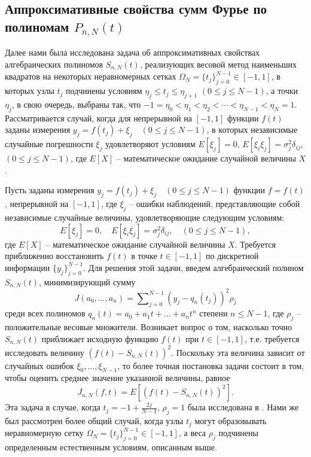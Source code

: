 
\subsection{Аппроксимативные свойства сумм Фурье по полиномам $P_{n,N}(t)$}

Далее нами была исследована задача об аппроксимативных свойствах  алгебраических полиномов $S_{n,N}(t)$, реализующих весовой метод наименьших квадратов на некоторых неравномерных сетках  $\Omega_N = \{ t_j \}_{j=0}^{N-1} \in [-1,1]$, в которых узлы $t_j$ подчинены условиям $\eta_{j}\leq t_{j} \leq \eta_{j+1}$ $(0\leq j \leq N-1)$, а точки $\eta_{j}$, в свою очередь, выбраны так, что $-1=\eta_{0}<\eta_{1}<\eta_{2}<\cdots<\eta_{N-1}<\eta_{N}=1$. Рассматривается случай, когда для  непрерывной на $[-1,1]$  функции $f(t)$ заданы измерения $y_j = f(t_j) + \xi_{j} \quad  (0 \leq j \leq N-1)$, в которых независимые случайные погрешности $\xi_{j}$ удовлетворяют условиям $E[\xi_j] = 0$, $E[\xi_i \xi_j] = \sigma_j^2 \delta_{ij}$, $(0 \leq j \leq N-1)$, где $E[X]$ -- математическое ожидание случайной величины $X$.




Пусть заданы измерения
$y_j = f(t_j) + \xi_{j} \quad  (0 \leq j \leq N-1)$
функции $f = f(t)$, непрерывной на $[-1, 1]$, где $\xi_j$ -- ошибки наблюдений, представляющие собой независимые случайные величины, удовлетворяющие следующим условиям:
\begin{equation}
\label{SMS2.link1}
 E[\xi_j] = 0, \quad E[\xi_i \xi_j] = \sigma_j^2 \delta_{ij}, \quad (0 \leq j \leq N-1),
\end{equation}
где $E[X]$ -- математическое ожидание случайной величины $X$.
Требуется приближенно восстановить $f(t)$ в точке $t \in [-1, 1]$ по дискретной информации $\{ y_j \}_{j=0}^{N-1}$.
Для решения этой задачи, введем алгебраический полином $S_{n,N}(t)$, минимизирующий сумму
\begin{equation*}
 J(a_0, \ldots, a_n) = \sum\nolimits_{j=0}^{N-1} \left( y_j - q_n(t_j)\right)^2 \rho_j
\end{equation*}
среди всех полиномов $q_n(t)=a_0+a_1 t + \ldots + a_n t^n$ степени $n \leq N-1$, где $\rho_j$ -- положительные весовые множители. Возникает вопрос о том, насколько точно $S_{n,N}(t)$ приближает исходную функцию $f(t)$ при $t \in [-1,1]$, т.е. требуется исследовать величину $\left( f(t) - S_{n,N}(t)\right)^2$. Поскольку эта величина зависит от случайных ошибок $\xi_0, \ldots, \xi_{N-1}$, то более точная постановка задачи состоит в том, чтобы оценить среднее значение указанной величины, равное
\begin{equation}
\label{SMS2.neww1}
 J_{n, N} (f, t) = E \left[ \left( f(t) - S_{n,N}(t)\right)^2 \right].
\end{equation}
Эта задача в случае, когда $t_j=-1+\frac{2j}{N-1}$, $\rho_j=1$ была исследована в \cite{nushii5}.
Нами же был рассмотрен более общий случай, когда узлы $t_j$ могут образовывать неравномерную сетку $\Omega_N = \{ t_j \}_{j=0}^{N-1} \in [-1,1]$, а веса $\rho_j$ подчинены определенным естественным условиям, описанным выше.

